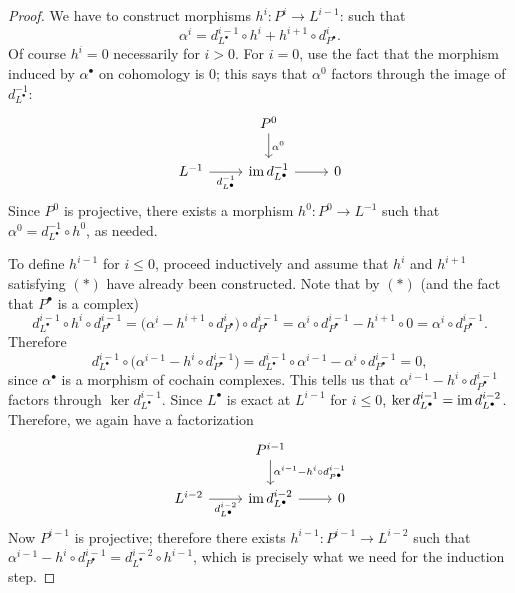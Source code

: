 \begin{proof}
  We have to construct morphisms $h^i : P^i \to L^{i-1}$:
  such that
  \[
    \alpha^i = d^{i-1}_{L^\bullet} \circ h^i + h^{i+1} \circ
    d^i_{P^\bullet}. \tag{$*$}
  \]
  Of course $h^i = 0$ necessarily for $i > 0$. For $i = 0$, use the
  fact that the morphism induced by $\alpha^\bullet$ on cohomology is
  $0$; this says that $\alpha^0$ factors through the image of
  $d^{-1}_{L^\bullet}$:
  \[\begin{tikzcd}
      & P^0 \arrow[d, "\alpha^0"] \\
      L^{-1} \arrow[r, "d_{L^\bullet}^{-1}"'] & \image
      d_{L^\bullet}^{-1} \arrow[r] & 0
    \end{tikzcd}\] Since $P^0$ is projective, there exists a morphism
  $h^0 : P^0 \to L^{-1}$ such that
  $\alpha^0 = d^{-1}_{L^\bullet} \circ h^0$, as needed.

  To define $h^{i-1}$ for $i \le 0$, proceed inductively and assume
  that $h^i$ and $h^{i+1}$ satisfying $(*)$ have already been
  constructed. Note that by $(*)$ (and the fact that $P^\bullet$ is a
  complex)
  \[
    d^{i-1}_{L^\bullet} \circ h^i \circ d^{i-1}_{P^\bullet} =
    \bigl(\alpha^i - h^{i+1} \circ d^i_{P^\bullet}\bigr) \circ
    d^{i-1}_{P^\bullet} = \alpha^i \circ d^{i-1}_{P^\bullet} - h^{i+1}
    \circ 0 = \alpha^i \circ d^{i-1}_{P^\bullet}.
  \]
  Therefore
  \[
    d^{i-1}_{L^\bullet} \circ \bigl(\alpha^{i-1} - h^i \circ
    d^{i-1}_{P^\bullet}\bigr) = d^{i-1}_{L^\bullet} \circ \alpha^{i-1}
    - \alpha^i \circ d^{i-1}_{P^\bullet} = 0,
  \]
  since $\alpha^\bullet$ is a morphism of cochain complexes. This
  tells us that $\alpha^{i-1} - h^i \circ d^{i-1}_{P^\bullet}$ factors
  through $\ker d^{i-1}_{L^\bullet}$. Since $L^\bullet$ is exact at
  $L^{i-1}$ for $i \le 0$,
  $\ker d^{i-1}_{L^\bullet} = \operatorname{im} d^{i-2}_{L^\bullet}$. Therefore,
  we again have a factorization
  \[\begin{tikzcd}
      & P^{i-1} \arrow[d, "\alpha^{i-1} - h^i \circ
      d_{P^\bullet}^{i-1}"] \\
      L^{i-2} \arrow[r, "d_{L^\bullet}^{i-2}"'] & \image
      d_{L^\bullet}^{i-2} \arrow[r] & 0
    \end{tikzcd}\] Now $P^{i-1}$ is projective; therefore there exists
  $h^{i-1} : P^{i-1} \to L^{i-2}$ such that
  $\alpha^{i-1} - h^i \circ d^{i-1}_{P^\bullet} = d^{i-2}_{L^\bullet}
  \circ h^{i-1}$, which is precisely what we need for the induction
  step.
\end{proof}
